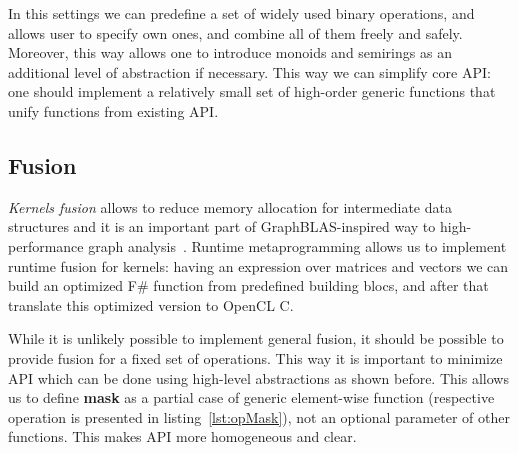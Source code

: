 In this settings we can predefine a set of widely used binary operations, and allows user to specify own ones, and combine all of them freely and safely.
Moreover, this way allows one to introduce monoids and semirings as an additional level of abstraction if necessary. This way we can simplify core API: one should implement a relatively small set of high-order generic functions that unify functions from existing API.  


\subsection{Fusion}

\textit{Kernels fusion} allows to reduce memory allocation for intermediate data structures and it is an important part of GraphBLAS-inspired way to high-performance graph analysis~\cite{10.1145/3466795}. Runtime metaprogramming allows us to implement runtime fusion for kernels: having an expression over matrices and vectors we can build an optimized F\# function from predefined building blocs, and after that translate this optimized version to OpenCL C.

While it is unlikely possible to implement general fusion, it should be possible to provide fusion for a fixed set of operations. This way it is important to minimize API which can be done using high-level abstractions as shown before. This allows us to define \textbf{mask} as a partial case of generic element-wise function (respective operation is presented in listing~\ref{lst:opMask}), not an optional parameter of other functions.
This makes API more homogeneous and clear. 
